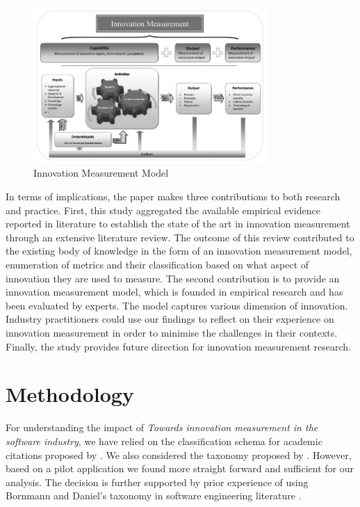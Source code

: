 \documentclass[sigplan]{acmart}
\newcommand{\theArticle}{\textit{Towards innovation measurement in the software industry}}
\begin{document}
\begin{figure}[!ht]
\includegraphics[width=0.8\textwidth]{im_model}
\caption{Innovation Measurement Model}
\label{fig:im_model}
\end{figure}

In terms of implications, the paper makes three contributions to both research and practice. First, this study aggregated the available empirical evidence reported in literature to establish the state of the art in innovation measurement through an extensive literature review. The outcome of this review contributed to the existing body of knowledge in the form of an innovation measurement model, enumeration of metrics and their classification based on what aspect of innovation they are used to measure. The second contribution is to provide an innovation measurement model, which is founded in empirical research and has been evaluated by experts. The model captures various dimension of innovation. Industry practitioners could use our findings to reflect on their experience on innovation measurement in order to minimise the challenges in their contexts. Finally, the study provides future direction for innovation measurement research.



\section{Methodology}\label{sec:method} 
For understanding the impact of \theArticle, we have relied on the classification schema for academic citations proposed by \citet{teufel2006annotation}. We also considered the taxonomy proposed by \citet{bornmann2008citation}. However, based on a pilot application we found \citet{teufel2006annotation} more straight forward and sufficient for our analysis. The decision is further supported by prior experience of using Bornmann and Daniel's taxonomy in software engineering literature \cite{poulding2015using}.
\end{document}
